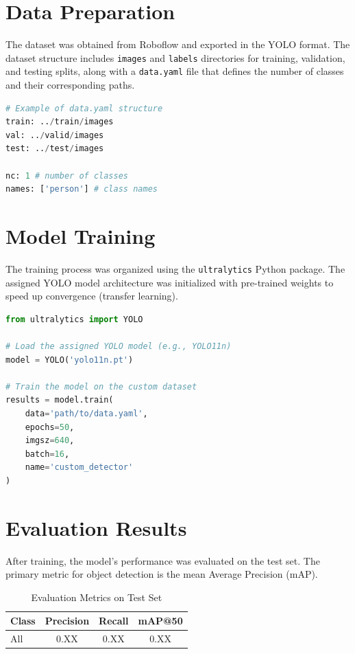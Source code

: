 \documentclass[12pt, a4paper]{article}
\begin{document}
\section{Data Preparation}
The dataset was obtained from Roboflow and exported in the YOLO format. The dataset structure includes \texttt{images} and \texttt{labels} directories for training, validation, and testing splits, along with a \texttt{data.yaml} file that defines the number of classes and their corresponding paths.

\begin{lstlisting}[language=Python, caption=Dataset Configuration (data.yaml example)]
# Example of data.yaml structure
train: ../train/images
val: ../valid/images
test: ../test/images

nc: 1 # number of classes
names: ['person'] # class names
\end{lstlisting}

\section{Model Training}
The training process was organized using the \texttt{ultralytics} Python package. The assigned YOLO model architecture was initialized with pre-trained weights to speed up convergence (transfer learning).

\begin{lstlisting}[language=Python, caption=YOLO Training Pipeline]
from ultralytics import YOLO

# Load the assigned YOLO model (e.g., YOLO11n)
model = YOLO('yolo11n.pt') 

# Train the model on the custom dataset
results = model.train(
    data='path/to/data.yaml', 
    epochs=50, 
    imgsz=640,
    batch=16,
    name='custom_detector'
)
\end{lstlisting}

\section{Evaluation Results}
After training, the model's performance was evaluated on the test set. The primary metric for object detection is the mean Average Precision (mAP).

\begin{table}[htpb]
    \centering
    \caption{Evaluation Metrics on Test Set}
    \label{tab:metrics}
    \begin{tabular}{lccc}
        \toprule
        \textbf{Class} & \textbf{Precision} & \textbf{Recall} & \textbf{mAP@50} \\
        \midrule
        All & 0.XX & 0.XX & 0.XX \\
        \bottomrule
    \end{tabular}
\end{table}
\end{document}
